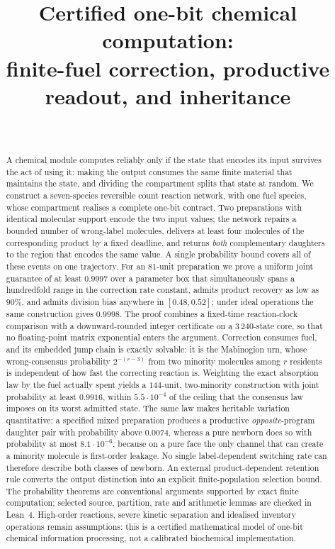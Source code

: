 \documentclass[11pt,a4paper]{article}
\title{Certified one-bit chemical computation:\\[4pt]
\large finite-fuel correction, productive readout, and inheritance}
\author{\PaperAuthor\\[2pt] {\small\itshape \PaperAffiliation}}
\date{\PaperDate}
\theoremstyle{plain}
\theoremstyle{definition}
\theoremstyle{remark}
\begin{document}
\maketitle

\begin{abstract}
A chemical module computes reliably only if the state that encodes its input survives
the act of using it: making the output consumes the same finite material that maintains
the state, and dividing the compartment splits that state at random. We construct a
seven-species reversible count reaction network, with one fuel species, whose
compartment realises a complete one-bit contract. Two preparations with identical
molecular support encode the two input values; the network repairs a bounded number of
wrong-label molecules, delivers at least four molecules of the corresponding product by
a fixed deadline, and returns \emph{both} complementary daughters to the region that
encodes the same value. A single probability bound covers all of these events on one
trajectory. For an $81$-unit preparation we prove a uniform joint guarantee of at least
$0.9997$ over a parameter box that simultaneously spans a hundredfold range in the
correction rate constant, admits product recovery as low as $90\%$, and admits division
bias anywhere in $[0.48,0.52]$;
under ideal operations the same construction gives $0.9998$. The proof combines a
fixed-time reaction-clock comparison with a downward-rounded integer certificate on a
$3\,240$-state core, so that no floating-point matrix exponential enters the argument.
Correction consumes fuel, and its embedded jump chain is exactly solvable: it is the
Mabinogion urn, whose wrong-consensus probability $2^{-(r-3)}$ from two minority
molecules among $r$ residents is independent of how fast the correcting reaction is.
Weighting the exact absorption law by the fuel actually spent yields a $144$-unit,
two-minority construction with joint probability at least $0.9916$, within
$5.5\cdot10^{-4}$ of the ceiling that the consensus law imposes on its worst admitted
state. The same law makes heritable variation quantitative: a specified mixed
preparation produces a productive \emph{opposite}-program daughter pair with probability
above $0.0074$, whereas a pure newborn does so with probability at most $8.1\cdot10^{-6}$,
because on a pure face the only channel that can create a minority molecule is
first-order leakage. No single label-dependent switching rate can therefore describe
both classes of newborn. An external product-dependent retention rule converts the
output distinction into an explicit finite-population selection bound. The probability
theorems are conventional arguments supported by exact finite computation; selected
source, partition, rate and arithmetic lemmas are checked in Lean~4. High-order
reactions, severe kinetic separation and idealised inventory operations remain
assumptions: this is a certified mathematical model of one-bit chemical information
processing, not a calibrated biochemical implementation.
\end{abstract}
\end{document}
